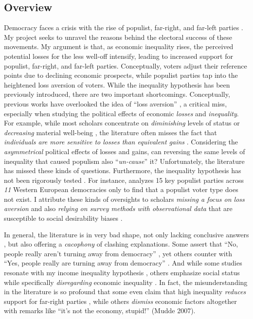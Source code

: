 \documentclass[letterpaper]{article}
\begin{document}
\vspace{-10mm}

\subsection*{Overview}

Democracy faces a crisis with the rise of populist, far-right, and far-left parties \parencite{Mudde2004,Coffe2007a}. My project seeks to unravel the reasons behind the electoral success of these movements. My argument is that, as economic inequality rises, the perceived potential losses for the less well-off intensify, leading to increased support for populist, far-right, and far-left parties. Conceptually, voters adjust their reference points due to declining economic prospects, while populist parties tap into the heightened loss aversion of voters. While the inequality hypothesis has been previously introduced, there are two important shortcomings. Conceptually, previous works have overlooked the idea of ``loss aversion'' \parencite{Kahneman1979}, a critical miss, especially when studying the political effects of economic \emph{losses} and \emph{inequality}. For example, while most scholars concentrate on \emph{diminishing} levels of status \parencite{Gidron2017a} or \emph{decreasing} material well-being \parencite{Oesch2008a}, the literature often misses the fact that \emph{individuals are more sensitive to losses than equivalent gains} \parencite[p. 171]{Levy1992a}. Considering the \emph{asymmetrical} political effects of losses and gains, can reversing the same levels of inequality that caused populism also ``\emph{un-cause}'' it? Unfortunately, the literature has missed these kinds of questions. Furthermore, the inequality hypothesis has not been rigorously tested \parencite[p. 154]{Engler2021}. For instance, \textcite{Rooduijn2018b} analyzes 15 key populist parties across \emph{11} Western European democracies only to find that a populist voter type does not exist. I attribute these kinds of oversights to scholars \emph{missing a focus on loss aversion} and also \emph{relying on survey methods with observational data} that are susceptible to social desirability biases \parencite{Kuklinski1997}. 

\vspace{2mm}In general, the literature is in very bad shape, not only lacking conclusive answers \parencite[p. 6]{Ivarsflaten2008}, but also offering a \emph{cacophony} of clashing explanations. Some assert that ``No, people really aren't turning away from democracy'' \parencite{Voeten2016}, yet others counter with ``Yes, people really are turning away from democracy'' \cite{Mounk2016}. And while some studies resonate with my income inequality hypothesis \parencite{Han2016b}, others emphasize social status while specifically \emph{disregarding} economic inequality \parencite{Gidron2017a,Oesch2008a}. In fact, the misunderstanding in the literature is so profound that some even claim that high inequality \emph{reduces} support for far-right parties \parencite[p. 725]{Patana2020b}, while others \emph{dismiss} economic factors altogether with remarks like ``it's not the economy, stupid!'' (Mudde 2007).  
\end{document}
